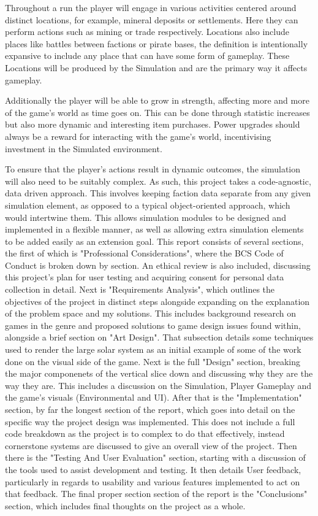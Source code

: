 \documentclass{report}
\begin{document}
Throughout a run the player will engage in various activities centered around distinct locations, for example, mineral deposits or settlements. Here they can perform actions such as mining or trade respectively. Locations also include places like battles between factions or pirate bases, the definition is intentionally expansive to include any place that can have some form of gameplay. These Locations will be produced by the Simulation and are the primary way it affects gameplay.

Additionally the player will be able to grow in strength, affecting more and more of the game's world as time goes on. This can be done through statistic increases but also more dynamic and interesting item purchases. Power upgrades should always be a reward for interacting with the game's world, incentivising investment in the Simulated environment.

To ensure that the player's actions result in dynamic outcomes, the simulation will also need to be suitably complex. As such, this project takes a code-agnostic, data driven approach. This involves keeping faction data separate from any given simulation element, as opposed to a typical object-oriented approach, which would intertwine them. This allows simulation modules to be designed and implemented in a flexible manner, as well as allowing extra simulation elements to be added easily as an extension goal.
\newline
\newline
This report consists of several sections, the first of which is "Professional Considerations", where the BCS Code of Conduct is broken down by section. An ethical review is also included, discussing this project's plan for user testing and acquiring consent for personal data collection in detail. Next is "Requirements Analysis", which outlines the objectives of the project in distinct steps alongside expanding on the explanation of the problem space and my solutions. This includes background research on games in the genre and proposed solutions to game design issues found within, alongside a brief section on "Art Design". That subsection details some techniques used to render the large solar system as an initial example of some of the work done on the visual side of the game.
Next is the full "Design" section, breaking the major componenets of the vertical slice down and discussing why they are the way they are. This includes a discussion on the Simulation, Player Gameplay and the game's visuals (Environmental and UI). After that is the "Implementation" section, by far the longest section of the report, which goes into detail on the specific way the project design was implemented. This does not include a full code breakdown as the project is to complex to do that effectively, instead cornerstone systems are discussed to give an overall view of the project.
Then there is the "Testing And User Evaluation" section, starting with a discussion of the tools used to assist development and testing. It then details User feedback, particularly in regards to usability and various features implemented to act on that feedback.
The final proper section section of the report is the "Conclusions" section, which includes final thoughts on the project as a whole.
\end{document}
